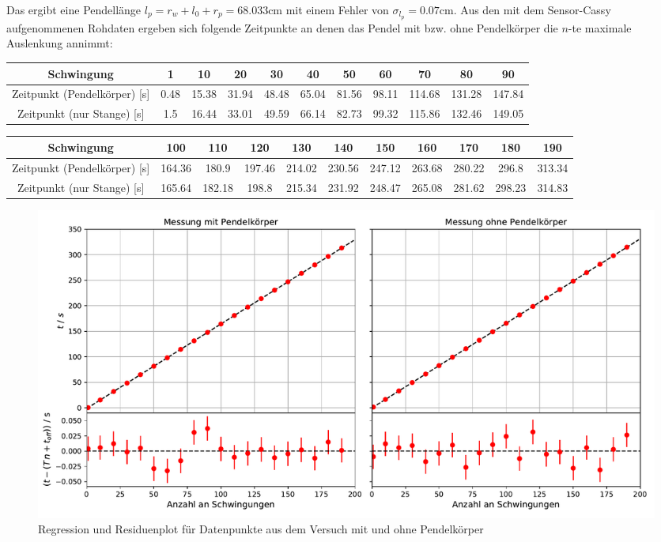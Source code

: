 Das ergibt eine Pendellänge $l_p = r_w + l_0 + r_p = 68.033 \text{cm}$ mit einem Fehler von $\sigma_{l_p} = 0.07 \text{cm}$. Aus den mit dem Sensor-Cassy aufgenommenen Rohdaten ergeben sich folgende Zeitpunkte an denen das Pendel mit bzw. ohne Pendelkörper die $n$-te maximale Auslenkung annimmt:

\begin{table}[H]
\centering

\begin{adjustbox}{width=\textwidth}
\begin{tabular}{c|cccccccccc}
Schwingung & 1 & 10 & 20 & 30 & 40 & 50 & 60 & 70 & 80 & 90 \\
\hline
Zeitpunkt (Pendelkörper) [s] & 0.48 & 15.38 & 31.94 & 48.48 & 65.04 & 81.56 & 98.11 & 114.68 & 131.28 & 147.84 \\
Zeitpunkt (nur Stange) [s] & 1.5 & 16.44 & 33.01 & 49.59 & 66.14 & 82.73 & 99.32 & 115.86 & 132.46 & 149.05
\end{tabular}
\end{adjustbox}
\end{table}

\begin{table}[H]
\centering
\begin{adjustbox}{width=\textwidth}
\begin{tabular}{c|cccccccccc}
Schwingung & 100 & 110 & 120 & 130 & 140 & 150 & 160 & 170 & 180 & 190 \\
\hline
Zeitpunkt (Pendelkörper) [s] & 164.36 & 180.9 & 197.46 & 214.02 & 230.56 & 247.12 & 263.68 & 280.22 & 296.8 & 313.34 \\
Zeitpunkt (nur Stange) [s] & 165.64 & 182.18 & 198.8 & 215.34 & 231.92 & 248.47 & 265.08 & 281.62 & 298.23 & 314.83
\end{tabular}
\end{adjustbox}
\end{table}

\begin{figure}[h]
	\centering
	\includegraphics[width = \textwidth]{plots/regression.pdf}
	\caption{Regression und Residuenplot für Datenpunkte aus dem Versuch mit und ohne Pendelkörper}\label{plot:regression}
\end{figure}

